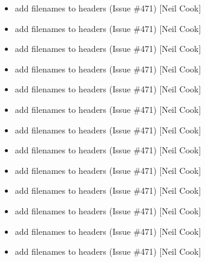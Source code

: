 \documentclass[a4paper,10pt,english]{report}
\begin{document}
\begin{itemize}
\item {} 
 \sphinxhyphen{} add filenames to headers (Issue  \#471) {[}Neil Cook{]}

\item {} 
 \sphinxhyphen{} add filenames to headers (Issue  \#471) {[}Neil
Cook{]}

\item {} 
 \sphinxhyphen{} add filenames to headers (Issue  \#471)
{[}Neil Cook{]}

\item {} 
 \sphinxhyphen{} add filenames to headers (Issue  \#471) {[}Neil
Cook{]}

\item {} 
 \sphinxhyphen{} add filenames to headers (Issue  \#471) {[}Neil
Cook{]}

\item {} 
 \sphinxhyphen{} add filenames to headers (Issue  \#471) {[}Neil
Cook{]}

\item {} 
 \sphinxhyphen{} add filenames to headers (Issue  \#471)
{[}Neil Cook{]}

\item {} 
 \sphinxhyphen{} add filenames to headers (Issue  \#471) {[}Neil
Cook{]}

\item {} 
 \sphinxhyphen{} add filenames to headers (Issue  \#471)
{[}Neil Cook{]}

\item {} 
 \sphinxhyphen{} add filenames to headers (Issue  \#471) {[}Neil
Cook{]}

\item {} 
 \sphinxhyphen{} add filenames to headers (Issue  \#471)
{[}Neil Cook{]}

\item {} 
 \sphinxhyphen{} add filenames to headers (Issue  \#471) {[}Neil Cook{]}

\item {} 
 \sphinxhyphen{} add filenames to headers (Issue  \#471) {[}Neil
Cook{]}


\end{itemize}
\end{document}

